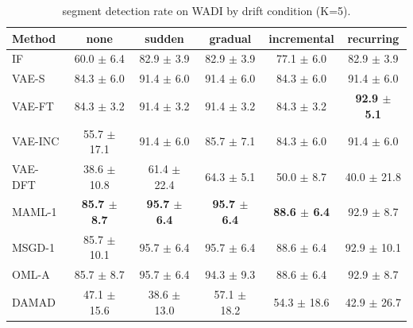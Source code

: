 \begin{table}[t]
\centering
\small
\caption{segment detection rate on WADI by drift condition (K=5).}
\label{tab:drift_segment_detection_rate_wadi}
\begin{tabular}{lccccc}
\toprule
Method & none & sudden & gradual & incremental & recurring \\
\midrule
IF & 60.0 $\pm$ 6.4 & 82.9 $\pm$ 3.9 & 82.9 $\pm$ 3.9 & 77.1 $\pm$ 6.0 & 82.9 $\pm$ 3.9 \\
VAE-S & 84.3 $\pm$ 6.0 & 91.4 $\pm$ 6.0 & 91.4 $\pm$ 6.0 & 84.3 $\pm$ 6.0 & 91.4 $\pm$ 6.0 \\
VAE-FT & 84.3 $\pm$ 3.2 & 91.4 $\pm$ 3.2 & 91.4 $\pm$ 3.2 & 84.3 $\pm$ 3.2 & \textbf{92.9 $\pm$ 5.1} \\
VAE-INC & 55.7 $\pm$ 17.1 & 91.4 $\pm$ 6.0 & 85.7 $\pm$ 7.1 & 84.3 $\pm$ 6.0 & 91.4 $\pm$ 6.0 \\
VAE-DFT & 38.6 $\pm$ 10.8 & 61.4 $\pm$ 22.4 & 64.3 $\pm$ 5.1 & 50.0 $\pm$ 8.7 & 40.0 $\pm$ 21.8 \\
MAML-1 & \textbf{85.7 $\pm$ 8.7} & \textbf{95.7 $\pm$ 6.4} & \textbf{95.7 $\pm$ 6.4} & \textbf{88.6 $\pm$ 6.4} & 92.9 $\pm$ 8.7 \\
MSGD-1 & 85.7 $\pm$ 10.1 & 95.7 $\pm$ 6.4 & 95.7 $\pm$ 6.4 & 88.6 $\pm$ 6.4 & 92.9 $\pm$ 10.1 \\
OML-A & 85.7 $\pm$ 8.7 & 95.7 $\pm$ 6.4 & 94.3 $\pm$ 9.3 & 88.6 $\pm$ 6.4 & 92.9 $\pm$ 8.7 \\
DAMAD & 47.1 $\pm$ 15.6 & 38.6 $\pm$ 13.0 & 57.1 $\pm$ 18.2 & 54.3 $\pm$ 18.6 & 42.9 $\pm$ 26.7 \\
\bottomrule
\end{tabular}
\end{table}

